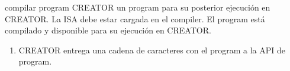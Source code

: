 \begin{useCase}{compilar}
    { \gls{program}} %
    {CREATOR} %
    { un \gls{program} para su posterior ejecución en CREATOR.} %
    {La \gls{ISA} debe estar cargada en el \gls{compiler}.} %
    {El \gls{program} está compilado y disponible para su ejecución en CREATOR.} %
    \begin{enumerate}[leftmargin=*, topsep=0pt, noitemsep]
        \item CREATOR entrega una cadena de caracteres con el \gls{program}
        a la \gls{API} de  \gls{program}.
    \end{enumerate}
\end{useCase}
